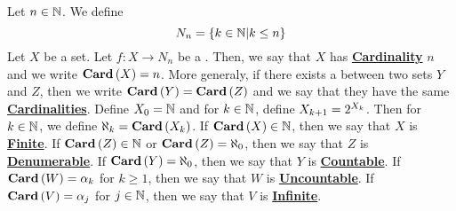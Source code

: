 \newcommand{\Cardinal}[0]{\textbf{\hyperref[def:Cardinality]{Cardinal}}\xspace}
\newcommand{\Cardinals}[0]{\textbf{\hyperref[def:Cardinality]{Cardinals}}\xspace}
\newcommand{\Cardinality}[0]{\textbf{\hyperref[def:Cardinality]{Cardinality}}\xspace}
\newcommand{\Cardinalities}[0]{\textbf{\hyperref[def:Cardinality]{Cardinalities}}\xspace}
\newcommand{\FirstNaturals}[1]{\ensuremath{N_{#1}}\xspace}
\newcommand{\CardinalityFunction}[1]{\ensuremath{\textbf{Card}\pa{#1}\xspace}}
\newcommand{\Finite}[0]{\textbf{\hyperref[def:Cardinality]{Finite}}\xspace}
\newcommand{\Infinite}[0]{\textbf{\hyperref[def:Cardinality]{Infinite}}\xspace}
\newcommand{\Denumerable}[0]{\textbf{\hyperref[def:Cardinality]{Denumerable}}\xspace}
\newcommand{\Countable}[0]{\textbf{\hyperref[def:Cardinality]{Countable}}\xspace}
\newcommand{\Uncountable}[0]{\textbf{\hyperref[def:Cardinality]{Uncountable}}\xspace}
\begin{df}[Cardinality]
\label{def:Cardinality}

\rm
    Let $n \in \mathbb{N}$. We define 
    \begin{equation*}
        \FirstNaturals{n}=\{ k \in \N | k \leq n\}
    \end{equation*}
    Let $X$ be a set.
    Let $f:X \to \FirstNaturals{n}$ 
    be a 
    \Bijection. 
    Then, we say that 
    $X$ has 
    \Cardinality
    $n$
    and we write 
    $\CardinalityFunction{X}=n$.
    More generaly, if there exists a 
    \Bijection
    between two sets 
    $Y$ and $Z$, then we write
    $\CardinalityFunction{Y}=\CardinalityFunction{Z}$
    and we say that they have the same 
    \Cardinalities. 
    Define
    $X_0=\mathbb{N}$
    and for $k \in \mathbb{N}$, define 
    $X_{k+1} = 2^{X_k}$. 
    Then for $k \in \mathbb{N}$, we define 
    $\aleph_k = \CardinalityFunction{X_k}$.
    If $\CardinalityFunction{X} \in \N$, then 
    we say that $X$ is \Finite. 
    If $\CardinalityFunction{Z} \in \N$ or 
    $\CardinalityFunction{Z} = \aleph_0$, 
    then we say that $Z$ is \Denumerable.
    If $\CardinalityFunction{Y} = \aleph_0$, then
    we say that $Y$ is \Countable.
    If $\CardinalityFunction{W}= \alpha_k$ for $k \geq 1$, 
    then we say that $W$ is \Uncountable. 
    If $\CardinalityFunction{V} = \alpha_j$ for $j \in \mathbb{N}$, 
    then we say that $V$ is \Infinite. 


\end{df}



